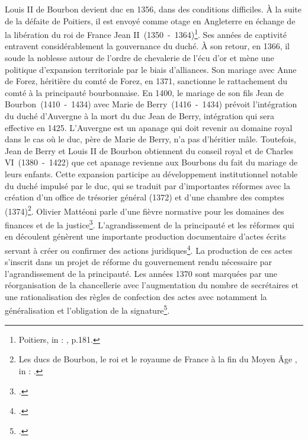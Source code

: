 \par Louis II de Bourbon devient duc en 1356, dans des conditions difficiles. À la suite de la défaite de Poitiers, il est envoyé comme otage en Angleterre en échange de la libération du roi de France Jean II~(1350~-~1364)\footnote{\og Poitiers\fg, in : \cite{favierGuerreCentAns1980}, p.181.}. Ses années de captivité entravent considérablement la gouvernance du duché. À son retour, en 1366, il soude la noblesse autour de l’ordre de chevalerie de l’écu d’or et mène une politique d'expansion territoriale par le biais d’alliances. Son mariage avec Anne de Forez, héritière du comté de Forez, en 1371, sanctionne le rattachement du comté à la principauté bourbonnaise. En 1400, le mariage de son fils Jean de Bourbon~(1410~-~1434) avec Marie de Berry~(1416~-~1434) prévoit l’intégration du duché d’Auvergne à la mort du duc Jean de Berry, intégration qui sera effective en 1425. L’Auvergne est un apanage qui doit revenir au domaine royal dans le cas où le duc, père de Marie de Berry, n’a pas d’héritier mâle. Toutefois, Jean de Berry et Louis II de Bourbon obtiennent du conseil royal et de Charles VI~(1380~-~1422) que cet apanage revienne aux Bourbons du fait du mariage de leurs enfants. Cette expansion participe au développement institutionnel notable du duché impulsé par le duc, qui se traduit par d’importantes réformes avec la création d’un office de trésorier général (1372) et d'une chambre des comptes (1374)\footnote{\og Les ducs de Bourbon, le roi et le royaume de France à la fin du Moyen Âge \fg, in : \cite{matteoniBourbonsLeurBibliotheque2022}.}. Olivier Mattéoni parle d'une \og fièvre normative \fg \space pour les domaines des finances et de la justice\footnote{\cite{matteoniProposOrdonnanceFinance2019}.}. L'agrandissement de la principauté et les réformes qui en découlent génèrent une importante production documentaire d'actes écrits servant à créer ou confirmer des actions juridiques\footnote{\cite{guyotjeanninDiplomatiqueMedievale2006}.}. La production de ces actes s’inscrit dans un projet de réforme du gouvernement rendu nécessaire par l'agrandissement de la principauté. Les années 1370 sont marquées par une réorganisation de la chancellerie avec l’augmentation du nombre de secrétaires et une rationalisation des règles de confection des actes avec notamment la généralisation et l’obligation de la signature\footnote{\cite{matteoniEcriturePouvoirPrincier2011}.}. 
\newline 

